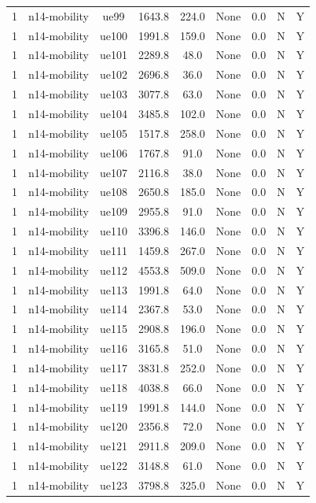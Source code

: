 \begin{table}[ht]
\begin{tabular}{|c|c|c|c|c|c|c|c|c|}
1 & n14-mobility & ue99 & 1643.8 & 224.0 & None & 0.0 & N & Y \\
1 & n14-mobility & ue100 & 1991.8 & 159.0 & None & 0.0 & N & Y \\
1 & n14-mobility & ue101 & 2289.8 & 48.0 & None & 0.0 & N & Y \\
1 & n14-mobility & ue102 & 2696.8 & 36.0 & None & 0.0 & N & Y \\
1 & n14-mobility & ue103 & 3077.8 & 63.0 & None & 0.0 & N & Y \\
1 & n14-mobility & ue104 & 3485.8 & 102.0 & None & 0.0 & N & Y \\
1 & n14-mobility & ue105 & 1517.8 & 258.0 & None & 0.0 & N & Y \\
1 & n14-mobility & ue106 & 1767.8 & 91.0 & None & 0.0 & N & Y \\
1 & n14-mobility & ue107 & 2116.8 & 38.0 & None & 0.0 & N & Y \\
1 & n14-mobility & ue108 & 2650.8 & 185.0 & None & 0.0 & N & Y \\
1 & n14-mobility & ue109 & 2955.8 & 91.0 & None & 0.0 & N & Y \\
1 & n14-mobility & ue110 & 3396.8 & 146.0 & None & 0.0 & N & Y \\
1 & n14-mobility & ue111 & 1459.8 & 267.0 & None & 0.0 & N & Y \\
1 & n14-mobility & ue112 & 4553.8 & 509.0 & None & 0.0 & N & Y \\
1 & n14-mobility & ue113 & 1991.8 & 64.0 & None & 0.0 & N & Y \\
1 & n14-mobility & ue114 & 2367.8 & 53.0 & None & 0.0 & N & Y \\
1 & n14-mobility & ue115 & 2908.8 & 196.0 & None & 0.0 & N & Y \\
1 & n14-mobility & ue116 & 3165.8 & 51.0 & None & 0.0 & N & Y \\
1 & n14-mobility & ue117 & 3831.8 & 252.0 & None & 0.0 & N & Y \\
1 & n14-mobility & ue118 & 4038.8 & 66.0 & None & 0.0 & N & Y \\
1 & n14-mobility & ue119 & 1991.8 & 144.0 & None & 0.0 & N & Y \\
1 & n14-mobility & ue120 & 2356.8 & 72.0 & None & 0.0 & N & Y \\
1 & n14-mobility & ue121 & 2911.8 & 209.0 & None & 0.0 & N & Y \\
1 & n14-mobility & ue122 & 3148.8 & 61.0 & None & 0.0 & N & Y \\
1 & n14-mobility & ue123 & 3798.8 & 325.0 & None & 0.0 & N & Y \\

\end{tabular}
\end{table}
